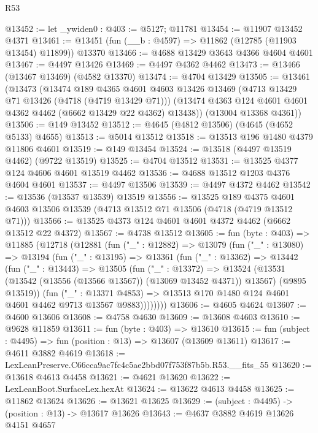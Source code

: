 \begin{lexlean}{R53}
\begin{coremodule}
@13452 := let _ywiden0 : @403 := @5127; @11781
@13454 := @11907 @13452 @4371
@13461 := @13451 (fun (__b : @4597) => @11862 (@12785 (@11903 @13454) @11899)) @13370
@13466 := @4688 @13429 @3643 @4366 @4604 @4601
@13467 := @4497 @13426
@13469 := @4497 @4362 @4462
@13473 := @13466 (@13467 @13469) (@4582 @13370)
@13474 := @4704 @13429
@13505 := @13461
    (@13473
      (@13474
        @189
        @4365
        @4601
        @4603
        @13426
        @13469
        (@4713 @13429 @71 @13426 (@4718 (@4719 @13429 @71)))
        (@13474 @4363 @124 @4601 @4601 @4362 @4462 (@6662 @13429 @22 @4362) @13438))
      (@13004 @13368 @4361))
@13506 := @149 @13452
@13512 := @4645 (@4812 @13506) (@4645 (@4652 @5133) @4655)
@13513 := @5014 @13512
@13518 := @13513 @196 @1480 @4379 @11806 @4601
@13519 := @149 @13454
@13524 := @13518 (@4497 @13519 @4462) (@9722 @13519)
@13525 := @4704 @13512
@13531 := @13525 @4377 @124 @4606 @4601 @13519 @4462
@13536 := @4688 @13512 @1203 @4376 @4604 @4601
@13537 := @4497 @13506
@13539 := @4497 @4372 @4462
@13542 := @13536 (@13537 @13539) @13519
@13556 := @13525
    @189
    @4375
    @4601
    @4603
    @13506
    @13539
    (@4713 @13512 @71 @13506 (@4718 (@4719 @13512 @71)))
@13566 := @13525 @4373 @124 @4601 @4601 @4372 @4462 (@6662 @13512 @22 @4372)
@13567 := @4738 @13512
@13605 := fun (byte : @403) =>
  @11885
    (@12718
      (@12881
        (fun ("_" : @12882) =>
        @13079
          (fun ("_" : @13080) =>
          @13194
            (fun ("_" : @13195) =>
            @13361
              (fun ("_" : @13362) =>
              @13442
                (fun ("_" : @13443) =>
                @13505
                  (fun ("_" : @13372) =>
                  @13524
                    (@13531 (@13542 (@13556 (@13566 @13567)) (@13069 @13452 @4371)) @13567)
                    (@9895 @13519))
                  (fun ("_" : @13371 @4853) =>
                  @13513 @170 @1480 @124 @4601 @4601 @4462 @9713 @13567 @9883))))))))
@13606 := @4605 @4624
@13607 := @4600 @13606
@13608 := @4758 @4630
@13609 := @13608 @4603
@13610 := @9628 @11859
@13611 := fun (byte : @403) => @13610
@13615 := fun (subject : @4495) => fun (position : @13) => @13607 (@13609 @13611)
@13617 := @4611 @3882 @4619
@13618 := LexLeanPreserve.C66cca9ac7fc4c5ae2bbd07f753f87b5b.R53.__fits_55
@13620 := @13618 @4613 @4458
@13621 := @4621 @13620
@13622 := LexLeanBoot.SurfaceLex.hexAt
@13624 := @13622 @4613 @4458
@13625 := @11862 @13624
@13626 := @13621 @13625
@13629 := (subject : @4495) -> (position : @13) -> @13617 @13626
@13643 := @4637
    @3882
    @4619
    @13626
    @4151
    @4657

\end{coremodule}
\end{lexlean}

